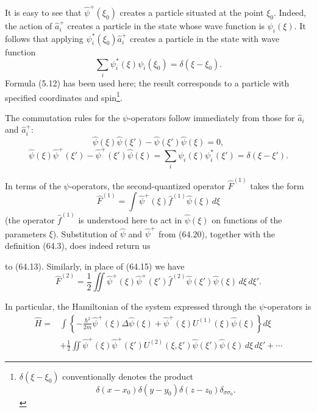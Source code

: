 It is easy to see that $\hat\psi^+(\xi_0)$ creates a particle situated at the
point $\xi_0$. Indeed, the action of $\hat a_i^+$ creates a particle in the
state whose wave function is $\psi_i(\xi)$. It follows that applying
$\psi_i^*(\xi_0)\hat a_i^+$ creates a particle in the state with wave function
\[
 \sum_i\psi_i^*(\xi)\psi_i(\xi_0)=\delta(\xi-\xi_0).
\]
Formula (5.12) has been used here; the result corresponds to a particle with
specified coordinates and spin\footnote{$\delta(\xi-\xi_0)$ conventionally
denotes the product
\[
 \delta(x-x_0)\delta(y-y_0)\delta(z-z_0)\delta_{\sigma\sigma_0}.
\]}.

The commutation rules for the $\psi$-operators follow immediately from those
for $\hat a_i$ and $\hat a_i^+$:
\begin{equation}
 \hat\psi(\xi)\hat\psi(\xi')-\hat\psi(\xi')\hat\psi(\xi)=0,
 \tag{64.21}
\end{equation}
\begin{equation}
 \hat\psi(\xi)\hat\psi^+(\xi')-\hat\psi^+(\xi')\hat\psi(\xi)
 =\sum_i\psi_i(\xi)\psi_i^*(\xi')=\delta(\xi-\xi').
 \tag{64.22}
\end{equation}

In terms of the $\psi$-operators, the second-quantized operator
$\hat F^{(1)}$ takes the form
\begin{equation}
 \hat F^{(1)}=\int\hat\psi^+(\xi)\hat f^{(1)}\hat\psi(\xi)\,d\xi
 \tag{64.23}
\end{equation}
(the operator $\hat f^{(1)}$ is understood here to act in $\hat\psi(\xi)$ on
functions of the parameters $\xi$). Substitution of $\hat\psi$ and
$\hat\psi^+$ from (64.20), together with the definition (64.3), does indeed
return us

to (64.13). Similarly, in place of (64.15) we have
\begin{equation}
 \hat F^{(2)}=\frac12\iint\hat\psi^+(\xi)\hat\psi^+(\xi')
 \hat f^{(2)}\hat\psi(\xi')\hat\psi(\xi)\,d\xi\,d\xi'.
 \tag{64.24}
\end{equation}

In particular, the Hamiltonian of the system expressed through the
$\psi$-operators is
\begin{equation}
 \begin{aligned}
 \hat H={}&\int\left\{-\frac{\hbar^2}{2m}\hat\psi^+(\xi)
 \Delta\hat\psi(\xi)+\hat\psi^+(\xi)U^{(1)}(\xi)\hat\psi(\xi)\right\}d\xi\\
 &+\frac12\iint\hat\psi^+(\xi)\hat\psi^+(\xi')U^{(2)}(\xi,\xi')
 \hat\psi(\xi')\hat\psi(\xi)\,d\xi\,d\xi'+\cdots
 \end{aligned}
 \tag{64.25}
\end{equation}

